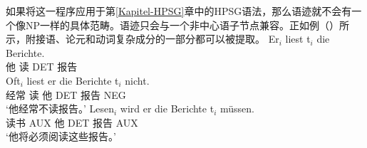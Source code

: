 如果将这一程序应用于第\ref{Kapitel-HPSG}章中的HPSG\indexhpsgc 语法，那么语迹就不会有一个像NP一样的具体范畴。语迹只会与一个非中心语子节点兼容。正如例（）所示，附接语、论元和动词复杂成分的一部分都可以被提取。
\eal
\ex 
\gll Er$_i$ liest t$_i$ die Berichte.\\
	 他 读 {}    DET 报告\\
\ex 
\gll Oft$_i$ liest er die Berichte t$_i$ nicht.\\
	 经常 读 他 DET 报告 {} NEG\\
\glt `他经常不读报告。'
\ex 
\gll Lesen$_i$ wird er die Berichte t$_i$ müssen.\\
	 读书 AUX 他 DET 报告 {} AUX\\
\glt `他将必须阅读这些报告。'
\zl

